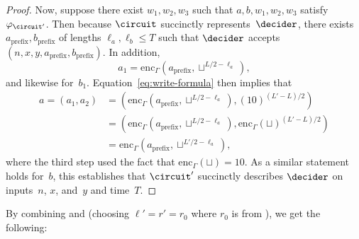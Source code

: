 \begin{proof}
  Now, suppose there exist $w_1, w_2, w_3$ such that $a, b, w_1, w_2, w_3$
  satisfy $\varphi_{\circuit'}$.
  Then because $\circuit$ succinctly represents~$\decider$, there exists
  $a_{\mathrm{prefix}}, b_{\mathrm{prefix}}$ of lengths $\ell_a, \ell_b \leq T$
  such that $\decider$ accepts $(n, x, y, a_{\mathrm{prefix}},
  b_{\mathrm{prefix}})$.
  In addition,
  \begin{equation*}
    a_1 = \mathrm{enc}_\Gamma(a_{\mathrm{prefix}}, \sqcup^{L/2-\ell_a}),
  \end{equation*}
  and likewise for~$b_1$.
  Equation~\eqref{eq:write-formula} then implies that
  \begin{align*}
    a = (a_1, a_2)
    &= (\mathrm{enc}_\Gamma(a_{\mathrm{prefix}}, \sqcup^{L/2-\ell_a}),
      (10)^{(L' - L)/2})\\
    &= (\mathrm{enc}_\Gamma(a_{\mathrm{prefix}}, \sqcup^{L/2-\ell_a}),
      \mathrm{enc}_\Gamma(\sqcup)^{(L' - L)/2})\\
    &= \mathrm{enc}_\Gamma(a_{\mathrm{prefix}}, \sqcup^{L'/2-\ell_a}),
  \end{align*}
  where the third step used the fact that $\mathrm{enc}_\Gamma(\sqcup) = 10$.
  As a similar statement holds for~$b$, this establishes that $\circuit'$
  succinctly describes $\decider$ on inputs~$n$, $x$, and~$y$ and time~$T$.
\end{proof}

By combining  and
 (choosing $\ell' = r' = r_0$ where $r_0$ is
from ), we get the following:

\newcommand{\paddedsuccinctdecider}{\mathsf{PaddedSuccinctDecider}}

